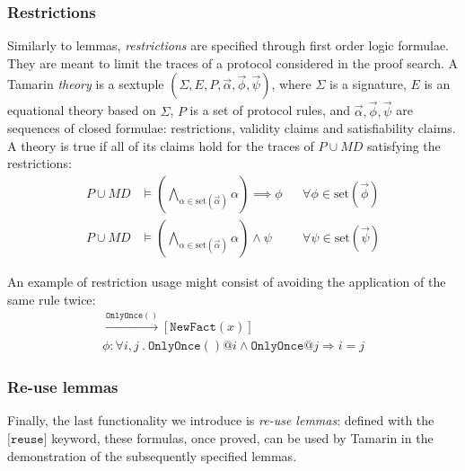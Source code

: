 \subsubsection{Restrictions}

Similarly to lemmas, \textit{restrictions} are specified through first order logic formulae. They are meant to limit the traces of a protocol considered in the proof search. A Tamarin \textit{theory} is a sextuple $(\Sigma, E, P, \vec{\alpha}, \vec{\phi}, \vec{\psi})$, where $\Sigma$ is a signature, $E$ is an equational theory based on $\Sigma$, $P$ is a set of protocol rules, and $\vec{\alpha}, \vec{\phi}, \vec{\psi}$ are sequences of closed formulae: restrictions, validity claims and satisfiability claims. A theory is true if all of its claims hold for the traces of $P \cup MD$ satisfying the restrictions:
\begin{align*}
    P \cup MD &\vDash \left( \bigwedge_{\alpha \in \text{set}(\vec{\alpha})} \alpha \right) \implies \phi &&\forall \phi \in \text{set}(\vec{\phi})\\
    P \cup MD &\vDash \left( \bigwedge_{\alpha \in \text{set}(\vec{\alpha})} \alpha \right) \land \psi &&\forall \psi \in \text{set}(\vec{\psi})
\end{align*}

An example of restriction usage might consist of avoiding the application of the same rule twice:
\begin{gather*}
    [\texttt{OldFact}(x)] \xrightarrow{\texttt{OnlyOnce}()} [\texttt{NewFact}(x)]\\
    \phi : \forall i,j  \ . \ \texttt{OnlyOnce}() @ i \land \texttt{OnlyOnce} @ j \Rightarrow i = j
\end{gather*}

\subsubsection{Re-use lemmas}

Finally, the last functionality we introduce is \textit{re-use lemmas}: defined with the $\texttt{[reuse]}$ keyword, these formulas, once proved, can be used by Tamarin in the demonstration of the subsequently specified lemmas.
